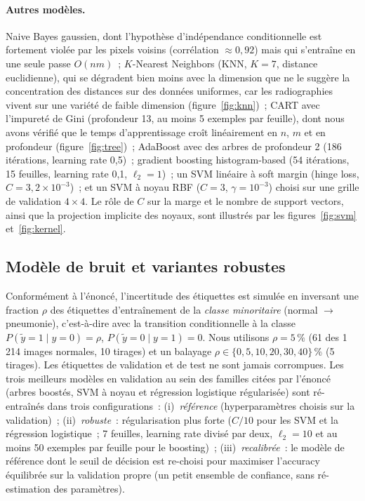 \documentclass[11pt,a4paper]{article}
\begin{document}
\paragraph{Autres modèles.} Naive Bayes gaussien, dont l'hypothèse d'indépendance conditionnelle est fortement violée par
les pixels voisins (corrélation $\approx 0{,}92$) mais qui s'entraîne en une seule passe $O(nm)$~; $K$-Nearest
Neighbors (KNN, $K=7$, distance euclidienne), qui se dégradent bien moins avec la dimension que ne le suggère la concentration
des distances sur des données uniformes, car les radiographies vivent sur une variété de faible dimension
(figure~\ref{fig:knn})~; CART avec l'impureté de Gini (profondeur 13, au moins 5 exemples par feuille), dont nous avons
vérifié que le temps d'apprentissage croît linéairement en $n$, $m$ et en profondeur (figure~\ref{fig:tree})~; AdaBoost
avec des arbres de profondeur 2 (186 itérations, learning rate 0,5)~; gradient boosting histogram-based
(54 itérations, 15 feuilles, learning rate 0,1, $\ell_2=1$)~; un SVM linéaire à soft margin (hinge loss,
$C=3{,}2\times10^{-3}$)~; et un SVM à noyau RBF ($C=3$, $\gamma=10^{-3}$) choisi sur une grille de validation
$4\times4$. Le rôle de $C$ sur la marge et le nombre de support vectors, ainsi que la projection implicite des
noyaux, sont illustrés par les figures~\ref{fig:svm} et~\ref{fig:kernel}.

\subsection{Modèle de bruit et variantes robustes}
Conformément à l'énoncé, l'incertitude des étiquettes est simulée en inversant une fraction $\rho$ des étiquettes
d'entraînement de la \emph{classe minoritaire} (normal $\to$ pneumonie), c'est-à-dire avec la transition conditionnelle
à la classe $P(\tilde y=1\mid y=0)=\rho$, $P(\tilde y=0\mid y=1)=0$. Nous utilisons $\rho=5\,\%$ (61 des 1\,214 images
normales, 10 tirages) et un balayage $\rho\in\{0,5,10,20,30,40\}\,\%$ (5 tirages). Les étiquettes de validation et de
test ne sont jamais corrompues. Les trois meilleurs modèles en validation au sein des familles citées par l'énoncé
(arbres boostés, SVM à noyau et régression logistique régularisée) sont ré-entraînés dans trois configurations~:
(i)~\emph{référence} (hyperparamètres choisis sur la validation)~;
(ii)~\emph{robuste}~: régularisation plus forte ($C/10$ pour les SVM et la régression logistique~; 7 feuilles, learning rate
divisé par deux, $\ell_2=10$ et au moins 50 exemples par feuille pour le boosting)~;
(iii)~\emph{recalibrée}~: le modèle de référence dont le seuil de décision est re-choisi pour maximiser l'accuracy
équilibrée sur la validation propre (un petit ensemble de confiance, sans ré-estimation des paramètres).
\end{document}
